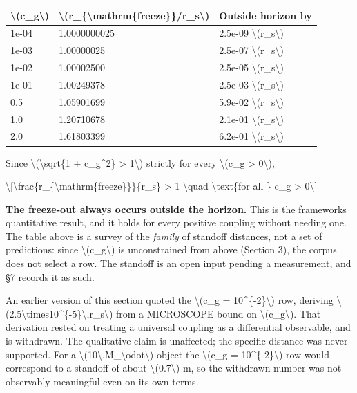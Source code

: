\documentclass[
  10pt,
]{article}
\begin{document}
\begin{longtable}[]{@{}lll@{}}
\toprule\noalign{}
\textbackslash(c\_g\textbackslash) &
\textbackslash(r\_\{\textbackslash mathrm\{freeze\}\}/r\_s\textbackslash)
& Outside horizon by \\
\midrule\noalign{}
\endhead
\bottomrule\noalign{}
\endlastfoot
1e-04 & 1.0000000025 & 2.5e-09 \textbackslash(r\_s\textbackslash) \\
1e-03 & 1.00000025 & 2.5e-07 \textbackslash(r\_s\textbackslash) \\
1e-02 & 1.00002500 & 2.5e-05 \textbackslash(r\_s\textbackslash) \\
1e-01 & 1.00249378 & 2.5e-03 \textbackslash(r\_s\textbackslash) \\
0.5 & 1.05901699 & 5.9e-02 \textbackslash(r\_s\textbackslash) \\
1.0 & 1.20710678 & 2.1e-01 \textbackslash(r\_s\textbackslash) \\
2.0 & 1.61803399 & 6.2e-01 \textbackslash(r\_s\textbackslash) \\
\end{longtable}

Since \textbackslash(\textbackslash sqrt\{1 + c\_g\^{}2\} \textgreater{}
1\textbackslash) strictly for every \textbackslash(c\_g \textgreater{}
0\textbackslash),

\textbackslash{[}\textbackslash frac\{r\_\{\textbackslash mathrm\{freeze\}\}\}\{r\_s\}
\textgreater{} 1 \textbackslash quad \textbackslash text\{for all \}
c\_g \textgreater{} 0\textbackslash{]}

\textbf{The freeze-out always occurs outside the horizon.} This is the
framework\textquotesingle s quantitative result, and it holds for every
positive coupling without needing one. The table above is a survey of
the \emph{family} of standoff distances, not a set of predictions: since
\textbackslash(c\_g\textbackslash) is unconstrained from above (Section
3), the corpus does not select a row. The standoff is an open input
pending a measurement, and §7 records it as such.

An earlier version of this section quoted the \textbackslash(c\_g =
10\^{}\{-2\}\textbackslash) row, deriving
\textbackslash(2.5\textbackslash times10\^{}\{-5\}\textbackslash,r\_s\textbackslash)
from a MICROSCOPE bound on \textbackslash(c\_g\textbackslash). That
derivation rested on treating a universal coupling as a differential
observable, and is withdrawn. The qualitative claim is unaffected; the
specific distance was never supported. For a
\textbackslash(10\textbackslash,M\_\textbackslash odot\textbackslash)
object the \textbackslash(c\_g = 10\^{}\{-2\}\textbackslash) row would
correspond to a standoff of about \textbackslash(0.7\textbackslash) m,
so the withdrawn number was not observably meaningful even on its own
terms.
\end{document}
